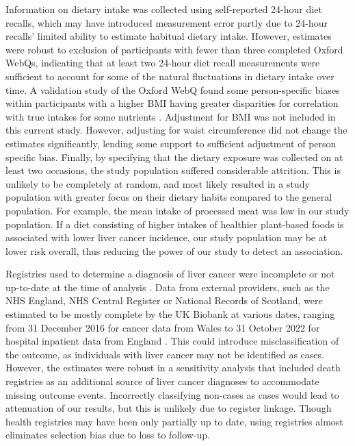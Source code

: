 \documentclass[nutrients,article,submit,moreauthors,pdftex]{Definitions/mdpi}
\begin{document}
Information on dietary intake was collected using self-reported 24-hour
diet recalls, which may have introduced measurement error partly due to
24-hour recalls' limited ability to estimate habitual dietary intake.
However, estimates were robust to exclusion of participants with fewer
than three completed Oxford WebQs, indicating that at least two 24-hour
diet recall measurements were sufficient to account for some of the
natural fluctuations in dietary intake over time. A validation study of
the Oxford WebQ found some person-specific biases within participants
with a higher BMI having greater disparities for correlation with true
intakes for some nutrients \citep{Greenwood2019}. Adjustment for BMI was not
included in this current study. However, adjusting for waist
circumference did not change the estimates significantly, lending some
support to sufficient adjustment of person specific bias. Finally, by
specifying that the dietary exposure was collected on at least two
occasions, the study population suffered considerable attrition. This is
unlikely to be completely at random, and most likely resulted in a study
population with greater focus on their dietary habits compared to the
general population. For example, the mean intake of processed meat was
low in our study population. If a diet consisting of higher intakes of
healthier plant-based foods is associated with lower liver cancer
incidence, our study population may be at lower risk overall, thus
reducing the power of our study to detect an association.

Registries used to determine a diagnosis of liver cancer were incomplete
or not up-to-date at the time of analysis \citep{RN112}. Data from external
providers, such as the NHS England, NHS Central Register or National
Records of Scotland, were estimated to be mostly complete by the UK
Biobank at various dates, ranging from 31 December 2016 for cancer data
from Wales to 31 October 2022 for hospital inpatient data from England
\citep{RN114}. This could introduce misclassification of the outcome, as
individuals with liver cancer may not be identified as cases. However,
the estimates were robust in a sensitivity analysis that included death
registries as an additional source of liver cancer diagnoses to
accommodate missing outcome events. Incorrectly classifying non-cases as
cases would lead to attenuation of our results, but this is unlikely due
to register linkage. Though health registries may have been only
partially up to date, using registries almost eliminates selection bias
due to loss to follow-up.
\end{document}
